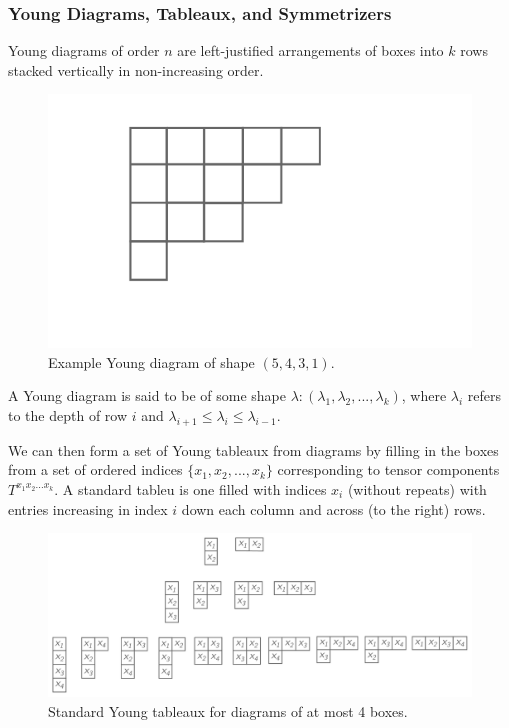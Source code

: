 \documentclass[10pt,a4paper]{article}
\begin{document}
\subsubsection*{Young Diagrams, Tableaux, and Symmetrizers}
Young diagrams of order $n$ are left-justified arrangements of boxes into $k$ rows stacked vertically in non-increasing order. 
\begin{figure}\centering
\includegraphics[scale=0.6]{youngdiagram-ex.pdf}
\caption{Example Young diagram of shape $(5,4,3,1)$.}
\end{figure}
A Young diagram is said to be of some shape $\lambda:(\lambda_1,\lambda_2,...,\lambda_k)$, where $\lambda_i$ refers to the depth of row $i$ and $\lambda_{i+1}\leq\lambda_i\leq\lambda_{i-1}$. 

We can then form a set of Young tableaux from diagrams by filling in the boxes from a set of ordered indices $\lbrace x_1,x_2,...,x_k\rbrace$ corresponding to tensor components $T^{x_1x_2...x_k}$.  A standard tableu is one filled with indices $x_i$ (without repeats) with entries increasing in index $i$ down each column and across (to the right) rows.
\begin{figure}\centering
\includegraphics[scale=0.5]{youngtableaux-ex.pdf}
\caption{Standard Young tableaux for diagrams of at most 4 boxes.}
\end{figure}
\end{document}
